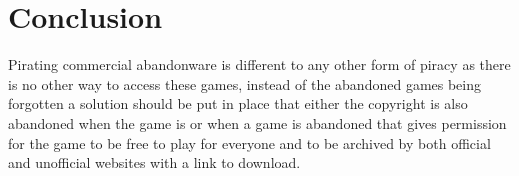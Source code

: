 \documentclass{scrartcl}
\begin{document}
\section*{Conclusion}

Pirating commercial abandonware is different to any other form of piracy as there is no other way to access these games, instead of the abandoned games being forgotten a solution should be put in place that either the copyright is also abandoned when the game is or when a game is abandoned that gives permission for the game to be free to play for everyone and to be archived by both official and unofficial websites with a link to download.



\end{document}
